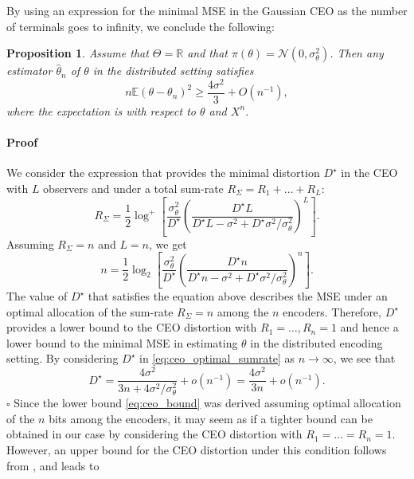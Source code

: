 \documentclass[letterpaper, conference]{IEEEtran}      %
\newtheorem{prop}[thm]{\bf {Proposition}}
\newenvironment{proof}{\paragraph*{Proof}}{\hfill$\square$ \newline}
\begin{document}
By using an expression for the minimal MSE in the Gaussian CEO as the number of terminals goes to infinity, we conclude the following:
\begin{prop} \label{prop:ceo_lower_bound}
Assume that $\Theta = \mathbb R$ and that $\pi(\theta) = \mathcal N(0,\sigma_\theta^2)$. Then any estimator $\widehat{\theta}_n$ of $\theta$ in the distributed setting satisfies
\begin{equation} \label{eq:ceo_bound}
 n\mathbb E \left( \theta - \theta_n \right)^2 \geq \frac{4\sigma^2}{3} + O(n^{-1}),
\end{equation}
where the expectation is with respect to $\theta$ and $X^n$.
\end{prop}

\begin{proof}
We consider the expression \cite[Eq. 10]{chen2004upper} that provides the minimal distortion $D^\star$ in the CEO with $L$ observers and under a total sum-rate $R_\Sigma = R_1 + \ldots +R_L$:
\begin{equation} \label{eq:ceo_optimal_sumrate}
R_{\Sigma} = \frac{1}{2} \log^+ \left[ \frac{\sigma_\theta^2}{D^\star} \left( \frac{D^\star L}{ D^\star L - \sigma^2 + D^\star \sigma^2 / \sigma_\theta^2 }\right)^L  \right].
\end{equation}
Assuming $R_\Sigma = n$ and $L=n$, we get
\begin{equation} \label{eq:ceo_optimal_sumrate}
n = \frac{1}{2} \log_2 \left[ \frac{\sigma_\theta^2}{D^\star} \left(\frac{ D^\star n }{D^\star n - \sigma^2 + D^\star \sigma^2/\sigma_\theta^2 }  \right)^n  \right].
\end{equation}
The value of $D^\star$ that satisfies the equation above describes the MSE under an optimal allocation of the sum-rate $R_\Sigma = n$ among the $n$ encoders. Therefore, $D^\star$ provides a lower bound to the CEO distortion with $R_1=\ldots,R_n = 1$ and hence a lower bound to the minimal MSE in estimating $\theta$ in the distributed encoding setting. By considering $D^\star$ in \eqref{eq:ceo_optimal_sumrate} as $n\rightarrow \infty$, we see that 
\[
D^\star = \frac{ 4\sigma^2 }{3n + 4 \sigma^2 / \sigma_\theta^2 } + o(n^{-1}) =  \frac{4\sigma^2}{3n} + o(n^{-1}). 
\]
\end{proof}
Since the lower bound \eqref{eq:ceo_bound}  was derived assuming optimal allocation of the $n$ bits among the encoders, it may seem as if a tighter bound can be obtained in our case by considering the CEO distortion with $R_1=\ldots = R_n = 1$. However, an upper bound for the CEO distortion under this condition follows from \cite[Prop. 5.2]{KipnisRini2017}, and leads to
\end{document}
